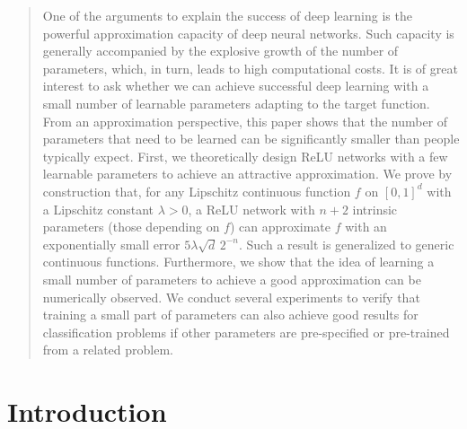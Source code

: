 \documentclass[nohyperref]{article}
\newif\ifarXiv
\theoremstyle{plain}
\theoremstyle{definition}
\theoremstyle{remark}
\begin{document}
\printAffiliationsAndNotice{\ifarXiv\textsuperscript{*}Correspondence to: Shijun Zhang (zhangshijun@u.nus.edu).\fi}  %
\ifarXiv\thispagestyle{myplain}\fi

\begin{abstract}
One of the arguments to explain the success of deep learning is the powerful approximation capacity of deep neural networks. Such capacity is generally accompanied by the explosive growth of the number of parameters, which, in turn, leads to high computational costs.  It is of great interest to ask whether we can achieve successful deep learning with a small number of learnable parameters adapting to the target function. From an approximation perspective, this paper shows that the number of parameters that need to be learned can be significantly smaller than people typically expect. 
First, we theoretically design ReLU networks with a few learnable parameters to achieve an attractive approximation. We prove by construction that, for any Lipschitz continuous function $f$ on $[0,1]^d$ with a Lipschitz constant $\lambda>0$, a ReLU network with $n+2$ intrinsic parameters (those depending on $f$) can approximate $f$ with an  exponentially small error $5\lambda \sqrt{d}\,2^{-n}$. Such a result is generalized to generic continuous functions. Furthermore, we show that the idea of learning a small number of parameters to achieve a good approximation can be numerically observed. We conduct several experiments to verify that training a small part of parameters can also achieve good results for classification problems if other parameters are pre-specified or pre-trained from a related problem. 
\end{abstract}









\section{Introduction}
\end{document}
